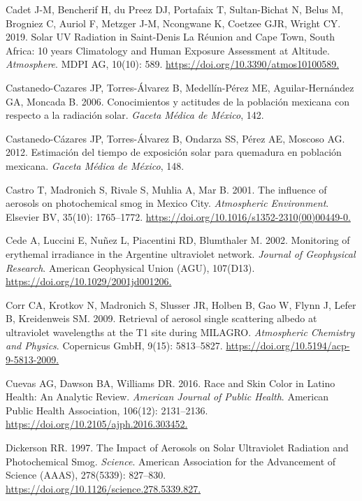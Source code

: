 \documentclass[10pt]{article}
\begin{document}
\label{csl:64}Cadet J-M, Bencherif H, du Preez DJ, Portafaix T, Sultan-Bichat N, Belus M, Brogniez C, Auriol F, Metzger J-M, Ncongwane K, Coetzee GJR, Wright CY. 2019. {Solar {UV} Radiation in Saint-Denis La R{\'{e}}union and Cape Town, South Africa: 10 years Climatology and Human Exposure Assessment at Altitude}. \textit{Atmosphere}. {MDPI} {AG}, 10(10): 589. \url{https://doi.org/10.3390/atmos10100589.}

\label{csl:41}Castanedo-Cazares JP, Torres-Álvarez B, Medellín-Pérez ME, Aguilar-Hernández GA, Moncada B. 2006. {Conocimientos y actitudes de la población mexicana con respecto a la radiación solar}. \textit{Gaceta Médica de México}, 142.

\label{csl:40}Castanedo-Cázares JP, Torres-Álvarez B, Ondarza SS, Pérez AE, Moscoso AG. 2012. {Estimación del tiempo de exposición solar para quemadura en población mexicana}. \textit{Gaceta Médica de México}, 148.

\label{csl:14}Castro T, Madronich S, Rivale S, Muhlia A, Mar B. 2001. {The influence of aerosols on photochemical smog in Mexico City}. \textit{Atmospheric Environment}. Elsevier {BV}, 35(10): 1765–1772. \url{https://doi.org/10.1016/s1352-2310(00)00449-0.}

\label{csl:25}Cede A, Luccini E, Nuñez L, Piacentini RD, Blumthaler M. 2002. {Monitoring of erythemal irradiance in the Argentine ultraviolet network}. \textit{Journal of Geophysical Research}. American Geophysical Union ({AGU}), 107(D13). \url{https://doi.org/10.1029/2001jd001206.}

\label{csl:21}Corr CA, Krotkov N, Madronich S, Slusser JR, Holben B, Gao W, Flynn J, Lefer B, Kreidenweis SM. 2009. {Retrieval of aerosol single scattering albedo at ultraviolet wavelengths at the T1 site during {MILAGRO}}. \textit{Atmospheric Chemistry and Physics}. Copernicus {GmbH}, 9(15): 5813–5827. \url{https://doi.org/10.5194/acp-9-5813-2009.}

\label{csl:47}Cuevas AG, Dawson BA, Williams DR. 2016. {Race and Skin Color in Latino Health: An Analytic Review}. \textit{American Journal of Public Health}. American Public Health Association, 106(12): 2131–2136. \url{https://doi.org/10.2105/ajph.2016.303452.}

\label{csl:12}Dickerson RR. 1997. {The Impact of Aerosols on Solar Ultraviolet Radiation and Photochemical Smog}. \textit{Science}. American Association for the Advancement of Science ({AAAS}), 278(5339): 827–830. \url{https://doi.org/10.1126/science.278.5339.827.}
\end{document}
